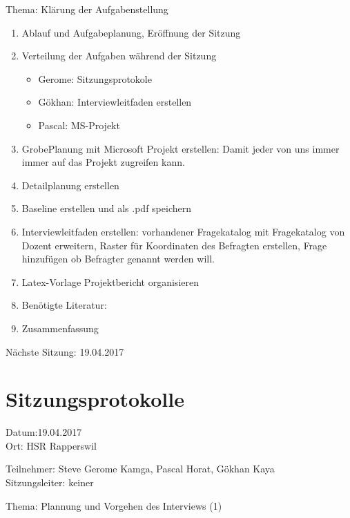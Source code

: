 Thema: Klärung der Aufgabenstellung
\begin{enumerate}

\item Ablauf und Aufgabeplanung, Eröffnung der Sitzung 

\item  Verteilung der Aufgaben während der Sitzung
\begin{itemize}
\item Gerome: Sitzungsprotokole
\item Gökhan: Interviewleitfaden erstellen
\item Pascal: MS-Projekt
\end{itemize}

\item GrobePlanung mit Microsoft Projekt erstellen: Damit jeder von uns immer immer auf das Projekt zugreifen kann.

\item Detailplanung erstellen

\item Baseline erstellen und als .pdf speichern

\item Interviewleitfaden erstellen: vorhandener Fragekatalog mit Fragekatalog von Dozent erweitern, Raster für Koordinaten des Befragten erstellen, Frage hinzufügen ob Befragter genannt werden will.

\item Latex-Vorlage Projektbericht organisieren

\item Benötigte Literatur: 

\item Zusammenfassung

\end{enumerate}

Nächste Sitzung: 19.04.2017

\newpage
\section*{Sitzungsprotokolle}

Datum:19.04.2017\\
Ort: HSR Rapperswil

Teilnehmer: Steve Gerome Kamga, Pascal Horat, Gökhan Kaya\\
Sitzungsleiter: keiner

Thema: Plannung und Vorgehen des Interviews (1)

